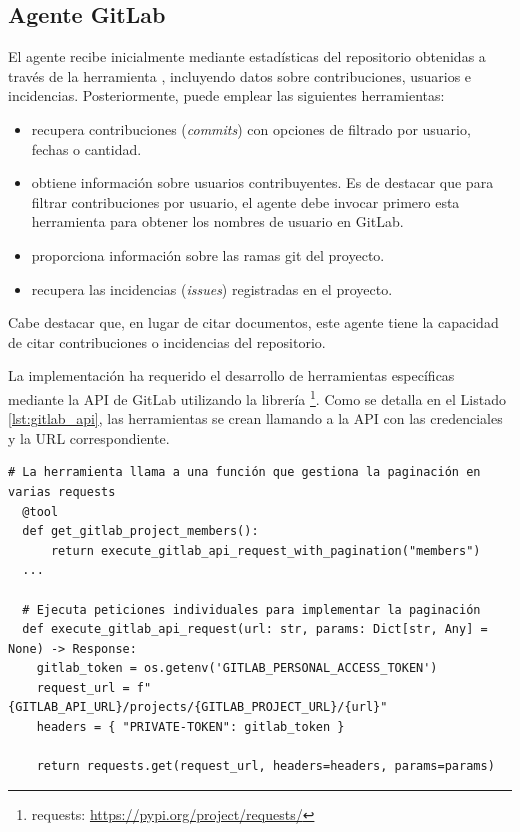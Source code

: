 \subsection{Agente GitLab}
\label{sec:agente_gitlab}
El agente recibe inicialmente mediante  estadísticas del repositorio obtenidas a través de la herramienta , incluyendo datos sobre contribuciones, usuarios e incidencias. Posteriormente, puede emplear las siguientes herramientas:
\begin{itemize}
  \item{} recupera contribuciones (\textit{commits}) con opciones de filtrado por usuario, fechas o cantidad.
\item{} obtiene información sobre usuarios contribuyentes. Es de destacar que para filtrar contribuciones por usuario, el agente debe invocar primero esta herramienta para obtener los nombres de usuario en GitLab.
\item{} proporciona información sobre las ramas git del proyecto.
\item{} recupera las incidencias (\textit{issues}) registradas en el proyecto.
\end{itemize}
Cabe destacar que, en lugar de citar documentos, este agente tiene la capacidad de citar contribuciones o incidencias del repositorio.

La implementación ha requerido el desarrollo de herramientas específicas mediante la API de GitLab utilizando la librería \footnote{requests: \url{https://pypi.org/project/requests/}}. Como se detalla en el Listado \ref{lst:gitlab_api}, las herramientas se crean llamando a la API con las credenciales y la URL correspondiente.

\begin{lstlisting}[caption={Ejemplo de herramienta para agente GitLab directamente desde la API},label={lst:gitlab_api}]
  # La herramienta llama a una función que gestiona la paginación en varias requests 
  @tool
  def get_gitlab_project_members():
      return execute_gitlab_api_request_with_pagination("members")
  ...

  # Ejecuta peticiones individuales para implementar la paginación
  def execute_gitlab_api_request(url: str, params: Dict[str, Any] = None) -> Response:
    gitlab_token = os.getenv('GITLAB_PERSONAL_ACCESS_TOKEN')
    request_url = f"{GITLAB_API_URL}/projects/{GITLAB_PROJECT_URL}/{url}"
    headers = { "PRIVATE-TOKEN": gitlab_token }

    return requests.get(request_url, headers=headers, params=params)
\end{lstlisting}



















